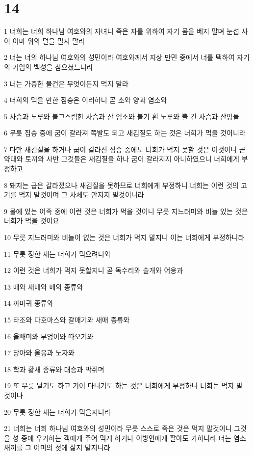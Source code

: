 \chapter{14}

\par 1 너희는 너희 하나님 여호와의 자녀니 죽은 자를 위하여 자기 몸을 베지 말며 눈섭 사이 이마 위의 털을 밀지 말라
\par 2 너는 너의 하나님 여호와의 성민이라 여호와께서 지상 만민 중에서 너를 택하여 자기의 기업의 백성을 삼으셨느니라
\par 3 너는 가증한 물건은 무엇이든지 먹지 말라
\par 4 너희의 먹을 만한 짐승은 이러하니 곧 소와 양과 염소와
\par 5 사슴과 노루와 불그스럼한 사슴과 산 염소와 볼기 흰 노루와 뿔 긴 사슴과 산양들
\par 6 무릇 짐승 중에 굽이 갈라져 쪽발도 되고 새김질도 하는 것은 너희가 먹을 것이니라
\par 7 다만 새김질을 하거나 굽이 갈라진 짐승 중에도 너희가 먹지 못할 것은 이것이니 곧 약대와 토끼와 사반 그것들은 새김질을 하나 굽이 갈라지지 아니하였으니 너희에게 부정하고
\par 8 돼지는 굽은 갈라졌으나 새김질을 못하므로 너희에게 부정하니 너희는 이런 것의 고기를 먹지 말것이며 그 사체도 만지지 말것이니라
\par 9 물에 있는 어족 중에 이런 것은 너희가 먹을 것이니 무릇 지느러미와 비늘 있는 것은 너희가 먹을 것이요
\par 10 무릇 지느러미와 비늘이 없는 것은 너희가 먹지 말지니 이는 너희에게 부정하니라
\par 11 무릇 정한 새는 너희가 먹으려니와
\par 12 이런 것은 너희가 먹지 못할지니 곧 독수리와 솔개와 어응과
\par 13 매와 새매와 매의 종류와
\par 14 까마귀 종류와
\par 15 타조와 다호마스와 갈매기와 새매 종류와
\par 16 올빼미와 부엉이와 따오기와
\par 17 당아와 올응과 노자와
\par 18 학과 황새 종류와 대승과 박쥐며
\par 19 또 무릇 날기도 하고 기어 다니기도 하는 것은 너희에게 부정하니 너희는 먹지 말 것이나
\par 20 무릇 정한 새는 너희가 먹을지니라
\par 21 너희는 너희 하나님 여호와의 성민이라 무릇 스스로 죽은 것은 먹지 말것이니 그것을 성 중에 우거하는 객에게 주어 먹게 하거나 이방인에게 팔아도 가하니라 너는 염소 새끼를 그 어미의 젖에 삶지 말지니라
